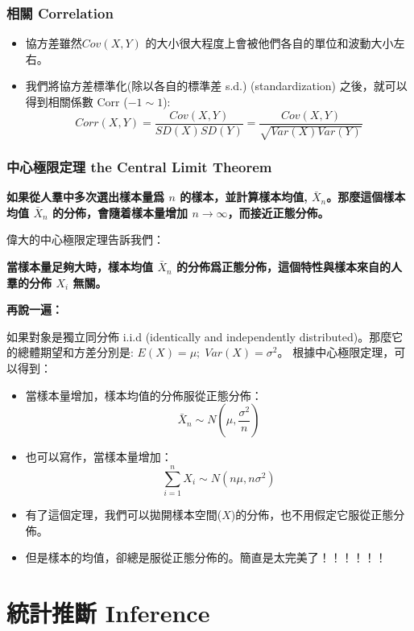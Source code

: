\documentclass[]{ctexbook}
\providecommand{\tightlist}{%
  \setlength{\itemsep}{0pt}\setlength{\parskip}{0pt}}
\begin{document}
\section{相關 Correlation}\label{-correlation}

\begin{itemize}
\tightlist
\item
  協方差雖然\(Cov(X,Y)\)
  的大小很大程度上會被他們各自的單位和波動大小左右。
\item
  我們將協方差標準化(除以各自的標準差 s.d.) (standardization)
  之後，就可以得到相關係數 Corr (\(-1\sim1\)):
  \[Corr(X,Y)=\frac{Cov(X,Y)}{SD(X)SD(Y)}=\frac{Cov(X,Y)}{\sqrt{Var(X)Var(Y)}}\]
\end{itemize}

\section{中心極限定理 the Central Limit
Theorem}\label{-the-central-limit-theorem-1}

\textbf{如果從人羣中多次選出樣本量爲 \(n\) 的樣本，並計算樣本均值,
\(\bar{X}_n\)。那麼這個樣本均值 \(\bar{X}_n\) 的分佈，會隨着樣本量增加
\(n\rightarrow\infty\)，而接近正態分佈。}

偉大的中心極限定理告訴我們：

\textbf{當樣本量足夠大時，樣本均值 \(\bar{X}_n\)
的分佈爲正態分佈，這個特性與樣本來自的人羣的分佈 \(X_i\) 無關。}

\textbf{再說一遍：}

如果對象是獨立同分佈 i.i.d (identically and independently
distributed)。那麼它的總體期望和方差分別是:
\(E(X)=\mu;\;Var(X)=\sigma^2\)。 根據中心極限定理，可以得到：

\begin{itemize}
\tightlist
\item
  當樣本量增加，樣本均值的分佈服從正態分佈：
  \[\bar{X}_n\sim N(\mu, \frac{\sigma^2}{n})\]
\item
  也可以寫作，當樣本量增加： \[\sum_{i=1}^nX_i \sim N(n\mu,n\sigma^2)\]
\item
  有了這個定理，我們可以拋開樣本空間(\(X\))的分佈，也不用假定它服從正態分佈。
\item
  但是樣本的均值，卻總是服從正態分佈的。簡直是太完美了！！！！！！
\end{itemize}

\part{統計推斷 Inference}\label{part--inference}
\end{document}
